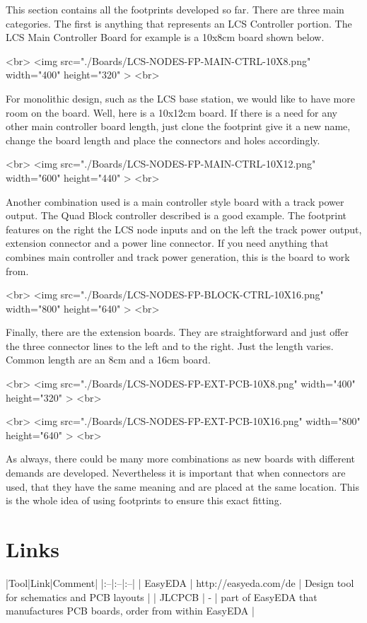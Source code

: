 This section contains all the footprints developed so far. There are three main categories. The first is anything that represents an LCS Controller portion. The LCS Main Controller Board for example is a 10x8cm board shown below.

<br>
<img src="./Boards/LCS-NODES-FP-MAIN-CTRL-10X8.png" width="400" height="320" > 
<br>

For monolithic design, such as the LCS base station, we would like to have more room on the board. Well, here is a 10x12cm board. If there is a need for any other main controller board length, just clone the footprint give it a new name, change the board length and place the connectors and holes accordingly.

<br>
<img src="./Boards/LCS-NODES-FP-MAIN-CTRL-10X12.png" width="600" height="440" >
<br>

Another combination used is a main controller style board with a track power output. The Quad Block controller described is a good example. The footprint features on the right the LCS node inputs and on the left the track power output, extension connector and a power line connector. If you need anything that combines main controller and track power generation, this is the board to work from.

<br>
<img src="./Boards/LCS-NODES-FP-BLOCK-CTRL-10X16.png" width="800" height="640" >
<br>

Finally, there are the extension boards. They are straightforward and just offer the three connector lines to the left and to the right. Just the length varies. Common length are an 8cm and a 16cm board.

<br>
<img src="./Boards/LCS-NODES-FP-EXT-PCB-10X8.png" width="400" height="320" >
<br>

<br>
<img src="./Boards/LCS-NODES-FP-EXT-PCB-10X16.png" width="800" height="640" >
<br>

As always, there could be many more combinations as new boards with different demands are developed. Nevertheless it is important that when connectors are used, that they have the same meaning and are placed at the same location. This is the whole idea of using footprints to ensure this exact fitting.

\section{Links}

|Tool|Link|Comment|
|:--|:--|:--|
| EasyEDA | http://easyeda.com/de | Design tool for schematics and PCB layouts |
| JLCPCB | - | part of EasyEDA that manufactures PCB boards, order from within EasyEDA |
